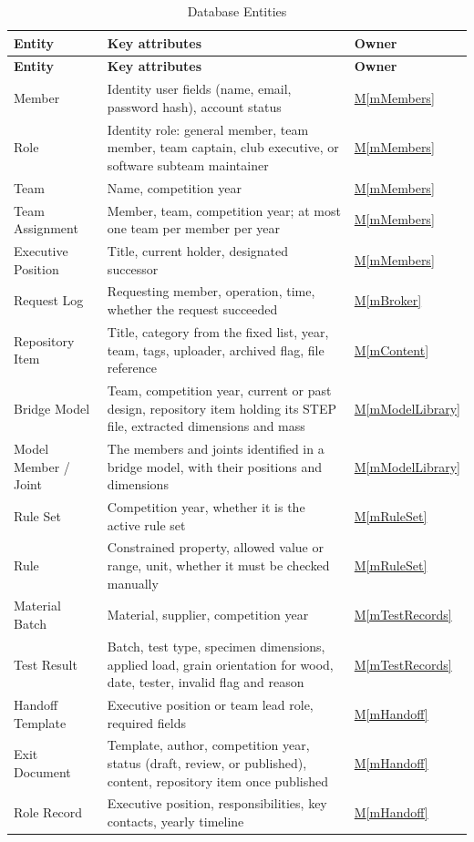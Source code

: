 \documentclass[12pt, titlepage]{article}
\newcommand{\mref}[1]{\hyperref[#1:dec]{M\ref*{#1}}}
\begin{document}
\begin{longtable}{>{\raggedright\arraybackslash}p{} >{\raggedright\arraybackslash}p{} >{\raggedright\arraybackslash}p{}}
\caption{Database Entities} \label{TblDB}\\
\toprule
\textbf{Entity} & \textbf{Key attributes} & \textbf{Owner}\\
\midrule
\endfirsthead
\toprule
\textbf{Entity} & \textbf{Key attributes} & \textbf{Owner}\\
\midrule
\endhead
\bottomrule
\endfoot
Member & Identity user fields (name, email, password hash), account status & \mref{mMembers}\\
Role & Identity role: general member, team member, team captain, club executive, or software subteam maintainer & \mref{mMembers}\\
Team & Name, competition year & \mref{mMembers}\\
Team Assignment & Member, team, competition year; at most one team per member per year & \mref{mMembers}\\
Executive Position & Title, current holder, designated successor & \mref{mMembers}\\
Request Log & Requesting member, operation, time, whether the request succeeded & \mref{mBroker}\\
Repository Item & Title, category from the fixed list, year, team, tags, uploader, archived flag, file reference & \mref{mContent}\\
Bridge Model & Team, competition year, current or past design, repository item holding its STEP file, extracted dimensions and mass & \mref{mModelLibrary}\\
Model Member / Joint & The members and joints identified in a bridge model, with their positions and dimensions & \mref{mModelLibrary}\\
Rule Set & Competition year, whether it is the active rule set & \mref{mRuleSet}\\
Rule & Constrained property, allowed value or range, unit, whether it must be checked manually & \mref{mRuleSet}\\
Material Batch & Material, supplier, competition year & \mref{mTestRecords}\\
Test Result & Batch, test type, specimen dimensions, applied load, grain orientation for wood, date, tester, invalid flag and reason & \mref{mTestRecords}\\
Handoff Template & Executive position or team lead role, required fields & \mref{mHandoff}\\
Exit Document & Template, author, competition year, status (draft, review, or published), content, repository item once published & \mref{mHandoff}\\
Role Record & Executive position, responsibilities, key contacts, yearly timeline & \mref{mHandoff}\\
\end{longtable}
\end{document}
